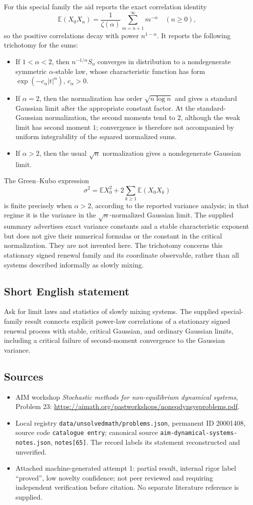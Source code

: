 \documentclass[11pt]{article}
\newcommand{\E}{\mathbb{E}}
\begin{document}
For this special family the aid reports the exact correlation identity
\[
 \E(X_0X_n)=\frac1{\zeta(\alpha)}\sum_{m=n+1}^{\infty}m^{-\alpha}\quad(n\ge0),
\]
so the positive correlations decay with power \(n^{1-\alpha}\). It reports the following trichotomy for the sums:
\begin{itemize}
\item If \(1<\alpha<2\), then \(n^{-1/\alpha}S_n\) converges in distribution to a nondegenerate symmetric \(\alpha\)-stable law, whose characteristic function has form \(\exp(-c_\alpha|t|^\alpha)\), \(c_\alpha>0\).
\item If \(\alpha=2\), then the normalization has order \(\sqrt{n\log n}\) and gives a standard Gaussian limit after the appropriate constant factor. At the standard-Gaussian normalization, the second moments tend to \(2\), although the weak limit has second moment \(1\); convergence is therefore not accompanied by uniform integrability of the squared normalized sums.
\item If \(\alpha>2\), then the usual \(\sqrt n\) normalization gives a nondegenerate Gaussian limit.
\end{itemize}
The Green--Kubo expression
\[
 \sigma^2=\E X_0^2+2\sum_{k\ge1}\E(X_0X_k)
\]
is finite precisely when \(\alpha>2\), according to the reported variance analysis; in that regime it is the variance in the \(\sqrt n\)-normalized Gaussian limit. The supplied summary advertises exact variance constants and a stable characteristic exponent but does not give their numerical formulas or the constant in the critical normalization. They are not invented here. The trichotomy concerns this stationary signed renewal family and its coordinate observable, rather than all systems described informally as slowly mixing.
\subsection{Short English statement}
Ask for limit laws and statistics of slowly mixing systems. The supplied special-family result connects explicit power-law correlations of a stationary signed renewal process with stable, critical Gaussian, and ordinary Gaussian limits, including a critical failure of second-moment convergence to the Gaussian variance.
\subsection{Sources}
\begin{itemize}
\item AIM workshop \emph{Stochastic methods for non-equilibrium dynamical systems}, Problem 23: \url{https://aimath.org/pastworkshops/noneqdynsysproblems.pdf}.
\item Local registry \texttt{data/unsolvedmath/problems.json}, permanent ID 20001408, source code \texttt{catalogue entry}; canonical source \texttt{aim-dynamical-systems-notes.json}, \texttt{notes[65]}. The record labels its statement reconstructed and unverified.
\item Attached machine-generated attempt 1: partial result, internal rigor label ``proved'', low novelty confidence; not peer reviewed and requiring independent verification before citation. No separate literature reference is supplied.
\end{itemize}
\end{document}
